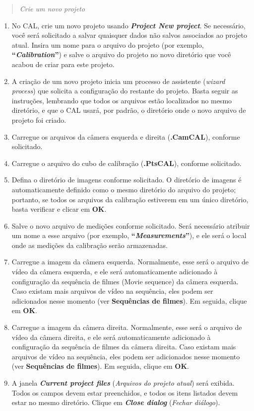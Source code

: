 \documentclass[
  12pt,
  letterpaper,
  DIV=11,
  numbers=noendperiod]{scrreprt}
\begin{document}
\begin{quote}
\emph{Crie um novo projeto}
\end{quote}

\begin{enumerate}
\def\labelenumi{\arabic{enumi}.}
\item
  No CAL, crie um novo projeto usando \textbf{\emph{Project \textbar{}
  New project}}. Se necessário, você será solicitado a salvar quaisquer
  dados não salvos associados ao projeto atual. Insira um nome para o
  arquivo do projeto (por exemplo,
  \textbf{``\textbf{\emph{Calibration}}''}) e salve o arquivo do projeto
  no novo diretório que você acabou de criar para este projeto.
\item
  A criação de um novo projeto inicia um processo de assistente
  (\emph{wizard process}) que solicita a configuração do restante do
  projeto. Basta seguir as instruções, lembrando que todos os arquivos
  estão localizados no mesmo diretório, e que o CAL usará, por padrão, o
  diretório onde o novo arquivo de projeto foi criado.
\item
  Carregue os arquivos da câmera esquerda e direita (\textbf{.CamCAL}),
  conforme solicitado.
\item
  Carregue o arquivo do cubo de calibração (\textbf{.PtsCAL}), conforme
  solicitado.
\item
  Defina o diretório de imagens conforme solicitado. O diretório de
  imagens é automaticamente definido como o mesmo diretório do arquivo
  do projeto; portanto, se todos os arquivos da calibração estiverem em
  um único diretório, basta verificar e clicar em \textbf{OK}.
\item
  Salve o novo arquivo de medições conforme solicitado. Será necessário
  atribuir um nome a esse arquivo (por exemplo,
  \textbf{``\textbf{\emph{Measurements}}''}), e ele será o local onde as
  medições da calibração serão armazenadas.
\item
  Carregue a imagem da câmera esquerda. Normalmente, esse será o arquivo
  de vídeo da câmera esquerda, e ele será automaticamente adicionado à
  configuração da sequência de filmes (Movie sequence) da câmera
  esquerda. Caso existam mais arquivos de vídeo na sequência, eles podem
  ser adicionados nesse momento (ver \textbf{Sequências de filmes}). Em
  seguida, clique em \textbf{OK}.
\item
  Carregue a imagem da câmera direita. Normalmente, esse será o arquivo
  de vídeo da câmera direita, e ele será automaticamente adicionado à
  configuração da sequência de filmes da câmera direita. Caso existam
  mais arquivos de vídeo na sequência, eles podem ser adicionados nesse
  momento (ver \textbf{Sequências de filmes}). Em seguida, clique em
  \textbf{OK}.
\item
  A janela \textbf{\emph{Current project files}} (\emph{Arquivos do
  projeto atual}) será exibida. Todos os campos devem estar preenchidos,
  e todos os itens listados devem estar no mesmo diretório. Clique em
  \textbf{\emph{Close dialog}} (\emph{Fechar diálogo}).
\end{enumerate}
\end{document}
